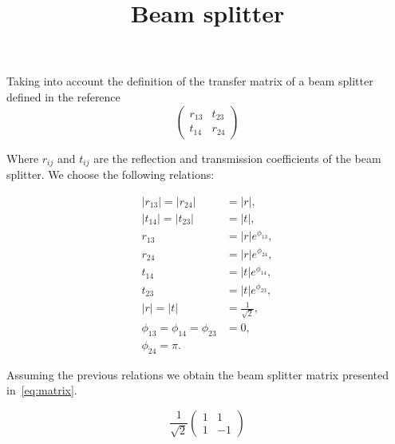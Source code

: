 \documentclass{article}
\begin{document}
\title{Beam splitter}
\maketitle

Taking into account the definition of the transfer matrix of a beam splitter defined in the reference~\cite{loudon2000quantum}
\begin{equation}
\begin{pmatrix}
r_{13} & t_{23}\\
t_{14} & r_{24}
\end{pmatrix}
\end{equation}

Where $r_{ij}$ and $t_{ij}$ are the reflection and transmission coefficients of the beam splitter. We choose the following relations:

\begin{align}
|r_{13}|=|r_{24}|&=|r|,\\
|t_{14}|=|t_{23}|&=|t|,\\
r_{13}&=|r|e^{\phi_{13}},\\
r_{24}&=|r|e^{\phi_{24}},\\
t_{14}&=|t|e^{\phi_{14}},\\
t_{23}&=|t|e^{\phi_{23}},\\
|r|=|t|&=\frac{1}{\sqrt{2}},\\
\phi_{13}=\phi_{14}=\phi_{23}&=0,\\
\phi_{24}=\pi.
\end{align}

Assuming the previous relations we obtain the beam splitter matrix presented in~\eqref{eq:matrix}.

\begin{equation}\label{eq:matrix}
\frac{1}{\sqrt{2}}
\begin{pmatrix}
1 & 1\\
1 & -1
\end{pmatrix}
\end{equation}




\end{document}
